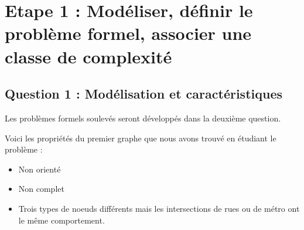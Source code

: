 


\section{Etape 1 : Modéliser, définir le problème formel, associer une classe de complexité}

  \subsection{Question 1 : Modélisation et caractéristiques}

    Les problèmes formels soulevés seront développés dans la deuxième question.

    Voici les propriétés du premier graphe que nous avons trouvé en étudiant le problème :

    \begin{itemize}
     \item Non orienté
     \item Non complet
     \item Trois types de noeuds différents mais les intersections de rues ou de métro ont le même comportement.
    \end{itemize}


